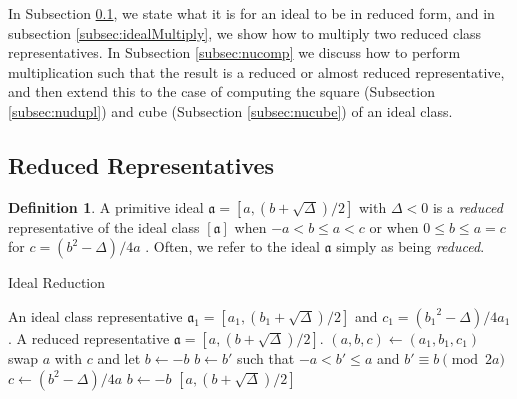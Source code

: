 \documentclass{ucalgthes1}
\theoremstyle{definition}
\newtheorem{defn}[thm]{Definition}
\newcommand{\ideal}{\mathfrak}
\newcommand{\idealclass}[1]{\left[ \ideal #1 \right]}
\newcommand{\aclass}{\idealclass a}
\begin{document}
In Subsection \ref{subsec:reduction}, we state what it is for an ideal to be in reduced form, and in subsection \ref{subsec:idealMultiply}, we show how to multiply two reduced class representatives. In Subsection \ref{subsec:nucomp} we discuss how to perform multiplication such that the result is a reduced or almost reduced representative, and then extend this to the case of computing the square (Subsection \ref{subsec:nudupl}) and cube (Subsection \ref{subsec:nucube}) of an ideal class.  


\subsection{Reduced Representatives}
\label{subsec:reduction}

\begin{defn}
\label{defn:reducedIdeal}
A primitive ideal $\ideal a = [a, (b+\sqrt{\Delta})/2]$ with $\Delta < 0$ is a \emph{reduced} representative of the ideal class $\aclass$ when $-a < b \le a < c$ or when $0 \le b \le a = c$ for $c = (b^2 - \Delta)/4a$ \cite[p.241]{Crandall2001}.  Often, we refer to the ideal $\ideal a$ simply as being \emph{reduced}.
\end{defn}

\begin{algorithm}[h]
\caption{Ideal Reduction}
\label{alg:reduce}
\begin{algorithmic}[1]
\REQUIRE An ideal class representative $\ideal a_1 = [a_1, (b_1+\sqrt\Delta)/2]$ and $c_1 = ({b_1}^2 - \Delta)/4a_1$.
\ENSURE A reduced representative $\ideal a = [a, (b+\sqrt\Delta)/2]$.
\STATE $(a, b, c) \gets (a_1, b_1, c_1)$
		\STATE swap $a$ with $c$ and let $b \gets -b$
	\ENDIF
		\STATE $b \gets b'$ such that $-a < b' \le a$ and $b' \equiv b \pmod{2a}$
		\STATE $c \gets (b^2-\Delta)/4a$
	\ENDIF
\ENDWHILE
{}
	\STATE $b \gets -b$
\ENDIF
\RETURN $[a, (b+\sqrt\Delta)/2]$
\end{algorithmic}
\end{algorithm}
\end{document}
